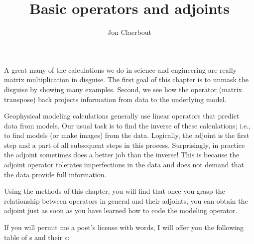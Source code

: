 
\title{Basic operators and adjoints}
\author{Jon Claerbout}
\maketitle

A great many of the calculations
we do in science and engineering
are really matrix multiplication in disguise.
The first goal of this chapter is to unmask the disguise
by showing many examples.
Second, we see how the 
 operator (matrix transpose)
back projects information from data to the underlying model.

\par
Geophysical modeling calculations
generally use linear operators that predict data from models.
Our usual task is to find the inverse of these calculations;
i.e., to find models (or make images) from the data.
Logically, the adjoint is the first step
and a part of all subsequent steps in this  process.
Surprisingly, in practice the adjoint sometimes does a better job
than the inverse!
This is because the adjoint operator tolerates imperfections
in the data and does not demand that the data provide full information.

\par
Using the methods of this chapter,
you will find that
once you grasp the relationship between operators in general
and their adjoints,
you can obtain the adjoint just
as soon as you have learned how to code
the modeling operator.

\par
If you will permit me a poet's license with words,
I will offer you the following table
of s and their s: 

